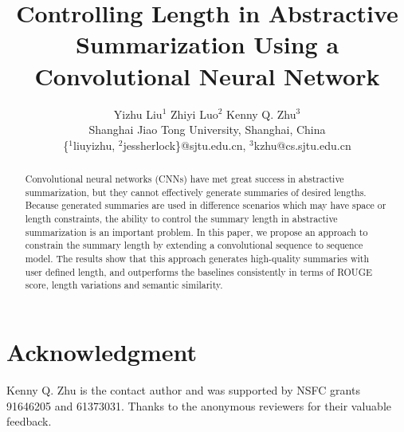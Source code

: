 \documentclass[11pt,a4paper]{article}
\title{Controlling Length in Abstractive Summarization Using a Convolutional
Neural Network}
\date{}
\begin{document}
\author{
 Yizhu Liu$^1$ \hspace*{1cm}
 Zhiyi Luo$^2$  \hspace*{1cm}
 Kenny Q. Zhu$^3$ 
 \\ 
 Shanghai Jiao Tong University, Shanghai, China \\
 \{$^1$liuyizhu, $^2$jessherlock\}@sjtu.edu.cn,
 $^3$kzhu@cs.sjtu.edu.cn
 }

\maketitle

\begin{abstract}
Convolutional neural networks (CNNs) have met great success
in abstractive summarization, but they
cannot effectively generate summaries
of desired lengths. Because generated summaries are used in difference
scenarios which may have space or length constraints,
the ability to control the summary length in abstractive summarization
is an important problem. In this paper, we propose an approach
to constrain the summary length by extending a convolutional
sequence to sequence model.  The results show that this approach 
generates high-quality summaries with user defined length, 
and outperforms the baselines consistently in terms of
ROUGE score, length variations and semantic similarity.
\end{abstract}


%




\section*{Acknowledgment}
Kenny Q. Zhu is the contact author and was supported by NSFC grants 
91646205 and 61373031. Thanks to the anonymous reviewers for their valuable 
feedback.

%


\end{document}
